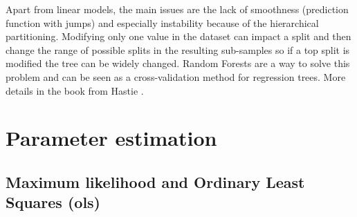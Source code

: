 \documentclass[12pt,a4paper]{report}
\begin{document}
 Apart from linear models, the main issues are the lack of smoothness (prediction function with jumps) and especially instability because of the hierarchical partitioning. Modifying only one value in the dataset can impact a split and then change the range of possible splits in the resulting sub-samples so if a top split is modified the tree can be widely changed. Random Forests are a way to solve this problem and can be seen as a cross-validation method for regression trees. More details in the book from Hastie \cite{hastie2009elements}.	
	
	
		\FloatBarrier
	\section{Parameter estimation}
	
	\subsection{Maximum likelihood and Ordinary Least Squares (\sc ols)}\label{sectionOLS}		%
\end{document}
